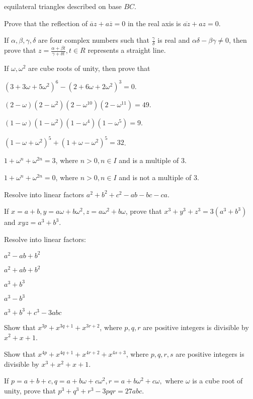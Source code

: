   equilateral triangles described on base $BC$.
\item Prove that the reflection of $\overline{a}z + a\overline{z} = 0$ in the real axis is $\overline{az} + az = 0$.
\item If $\alpha, \beta, \gamma, \delta$ are four complex numbers such that $\frac{\gamma}{\delta}$ is real and $\alpha\delta -
  \beta\gamma \neq 0$, then prove that $z = \frac{\alpha + \beta t}{\gamma + \delta t}, t\in R$ represents a straight line.
\item If $\omega, \omega^2$ are cube roots of unity, then prove that
  \startitemize[i]
  \item $(3 + 3\omega + 5\omega^2)^6 - (2 + 6\omega + 2\omega^2)^3 = 0$.
  \item $(2 - \omega)(2 - \omega^2)(2 - \omega^{10})(2 - \omega^{11}) = 49$.
  \item $(1 - \omega)(1 - \omega^2)(1 - \omega^4)(1 - \omega^5) = 9$.
  \item $(1 - \omega + \omega^2)^5 + (1 + \omega - \omega^2)^5 = 32$.
  \item $1 + \omega^n + \omega^{2n} = 3$, where $n >0, n\in I$ and is a multiple of $3$.
  \item $1 + \omega^n + \omega^{2n} = 0$, where $n >0, n\in I$ and is not a multiple of $3$.
  \stopitemize
\item Resolve into linear factors $a^2 + b^2 + c^2 - ab - bc - ca$.
\item If $x = a + b, y = a\omega + b\omega^2, z = a\omega^2 + b\omega$, prove that $x^3 + y^3 + z^3 = 3(a^3 + b^3)$ and $xyz = a^3
  + b^3$.
\item Resolve into linear factors:
  \startitemize[i]
  \item $a^2 - ab + b^2$
  \item $a^2 + ab + b^2$
  \item $a^3 + b^3$
  \item $a^3 - b^3$
  \item $a^3 + b^3 + c^3 - 3abc$
  \stopitemize
\item Show that $x^{3p} + x^{3q + 1} + x^{3r + 2}$, where $p, q, r$ are positive integers is divisible by $x^2 + x + 1$.
\item Show that $x^{4p} + x^{4q + 1} + x^{4r + 2} + x^{4s + 3}$, where $p, q, r, s$ are positive integers is divisible by $x^3 +
  x^2 + x + 1$.
\item If $p = a + b + c, q = a + b\omega + c\omega^2, r = a + b\omega^2 + c\omega,$ where $\omega$ is a cube root of unity, prove
  that $p^3 + q^3 + r^3 - 3pqr = 27abc$.
